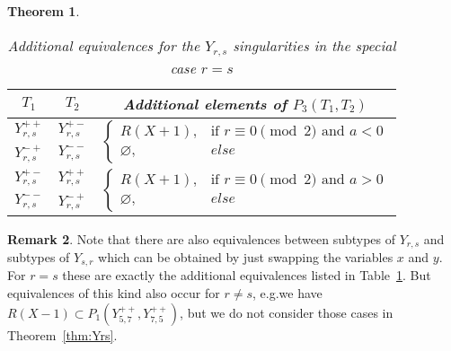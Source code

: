 \documentclass[noend]{amsproc}
\newtheorem{theorem}{Theorem}
\theoremstyle{definition}
\newtheorem{remark}[theorem]{Remark}
\begin{document}
\begin{theorem}
\begin{table}[!htbp]
\centering
\caption{Additional equivalences for the $Y_{r,s}$ singularities in the
special case $r = s$}
\label{tab:Yrr_equivalences}
\begin{tabular}{|c|c||c|}
\hline

$T_1$ & $T_2$ & Additional elements of $P_3(T_1, T_2)$ \\
\hline\hline

$Y_{r,s}^{++}$ & $Y_{r,s}^{+-}$ &
\multirow{2}{*}{$\begin{cases}
  R(X+1),      &\!\text{if } r \equiv 0 \pmod{2} \text{ and } a < 0 \\
  \varnothing, &else
\end{cases}$}
\\ \cline{1-2}

$Y_{r,s}^{-+}$ & $Y_{r,s}^{--}$ &
\\ \hline

$Y_{r,s}^{+-}$ & $Y_{r,s}^{++}$ &
\multirow{2}{*}{$\begin{cases}
  R(X+1),      &\!\text{if } r \equiv 0 \pmod{2} \text{ and } a > 0 \\
  \varnothing, &else
\end{cases}$}
\\ \cline{1-2}

$Y_{r,s}^{--}$ & $Y_{r,s}^{-+}$ &
\\ \hline

\end{tabular}
\end{table}

\end{theorem}

\begin{remark}
Note that there are also equivalences between subtypes of $Y_{r,s}$ and
subtypes of $Y_{s,r}$ which can be obtained by just swapping the variables $x$
and $y$. For $r = s$ these are exactly the additional equivalences listed in
Table~\ref{tab:Yrr_equivalences}. But equivalences of this kind also occur for
$r \neq s$, e.g.\@ we have $R(X-1) \subset P_1(Y_{5,7}^{++}, Y_{7,5}^{++})$,
but we do not consider those cases in Theorem~\ref{thm:Yrs}.
\end{remark}
\end{document}
